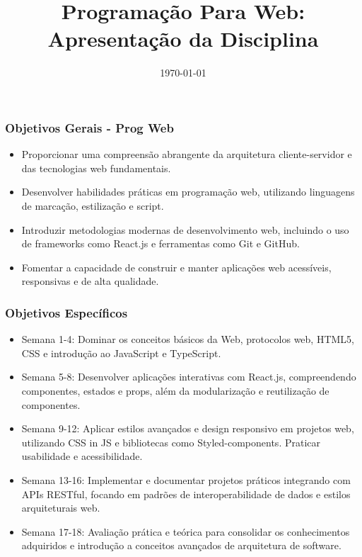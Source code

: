 \title{Programação Para Web: Apresentação da Disciplina}
\date{\today}
\frame{\titlepage}

\begin{frame}[fragile]
  \frametitle{Objetivos Gerais - Prog Web}
  \begin{itemize}
    \item Proporcionar uma compreensão abrangente da arquitetura cliente-servidor e das tecnologias web fundamentais.
    \item Desenvolver habilidades práticas em programação web, utilizando linguagens de marcação, estilização e script.
    \item Introduzir metodologias modernas de desenvolvimento web, incluindo o uso de frameworks como React.js e ferramentas como Git e GitHub.
    \item Fomentar a capacidade de construir e manter aplicações web acessíveis, responsivas e de alta qualidade.
  \end{itemize}
\end{frame}

\begin{frame}[fragile]
  \frametitle{Objetivos Específicos}
  \begin{itemize}
    \item Semana 1-4: Dominar os conceitos básicos da Web, protocolos web, HTML5, CSS e introdução ao JavaScript e TypeScript.
    \item Semana 5-8: Desenvolver aplicações interativas com React.js, compreendendo componentes, estados e props, além da modularização e reutilização de componentes.
    \item Semana 9-12: Aplicar estilos avançados e design responsivo em projetos web, utilizando CSS in JS e bibliotecas como Styled-components. Praticar usabilidade e acessibilidade.
    \item Semana 13-16: Implementar e documentar projetos práticos integrando com APIs RESTful, focando em padrões de interoperabilidade de dados e estilos arquiteturais web.
    \item Semana 17-18: Avaliação prática e teórica para consolidar os conhecimentos adquiridos e introdução a conceitos avançados de arquitetura de software.
  \end{itemize}
\end{frame}


